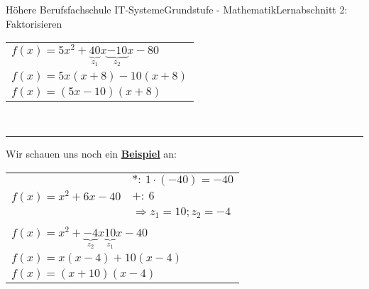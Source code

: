 \documentclass[11pt,twocolumn,oneside,openany,headings=optiontotoc,11pt,numbers=noenddot]{article}
\begin{document}
\begin{worksheet}{Höhere Berufsfachschule IT-Systeme}{Grundstufe - Mathematik}{Lernabschnitt 2: Faktorisieren}
\begin{tabularx}{0.5\textwidth}{X|l}
			\multicolumn{2}{l}{\(f(x) = 5x^2 + \underbrace{40}_{z_1}x \underbrace{-10}_{z_2}x -80\)}\\
			\multicolumn{2}{l}{\(f(x) = 5x(x+8) -10(x+8)\)}\\
			\multicolumn{2}{l}{\(f(x) = (5x-10)(x+8)\)}
		\end{tabularx}\\
		\par\noindent
		\rule{0.45\textwidth}{0.1pt}
		Wir schauen uns noch ein \underline{\textbf{Beispiel}} an:\\
		\par\noindent
		\begin{tabularx}{0.5\textwidth}{X|l}
			\cline{2-2}
			& \(*:\ 1\cdot(-40)=-40\)\\
			\(f(x) = x^2 + 6x - 40\) & \(+:\ 6\)\\
			& \(\Rightarrow z_1 = 10; z_2 = -4\)\\
			\cline{2-2}
			\multicolumn{2}{l}{}\\
			\multicolumn{2}{l}{\(f(x) = x^2 + \underbrace{-4}_{z_2}x \underbrace{10}_{z_1}x - 40\)}\\
			\multicolumn{2}{l}{\(f(x) = x(x-4) + 10(x-4)\)}\\
			\multicolumn{2}{l}{\(f(x) = (x+10)(x-4)\)}
		\end{tabularx}

\end{worksheet}
\end{document}
